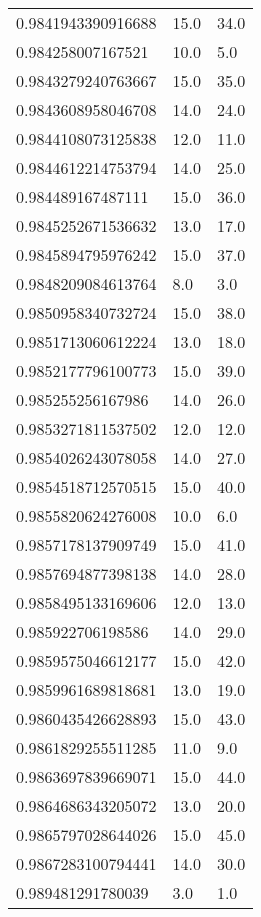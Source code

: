 \begin{center}
\begin{supertabular}[H]{p{0.30\textwidth}p{0.05\textwidth}p{0.05\textwidth}}
0.9841943390916688 & 15.0 & 34.0 \\ 
0.984258007167521 & 10.0 & 5.0 \\ 
0.9843279240763667 & 15.0 & 35.0 \\ 
0.9843608958046708 & 14.0 & 24.0 \\ 
0.9844108073125838 & 12.0 & 11.0 \\ 
0.9844612214753794 & 14.0 & 25.0 \\ 
0.984489167487111 & 15.0 & 36.0 \\ 
0.9845252671536632 & 13.0 & 17.0 \\ 
0.9845894795976242 & 15.0 & 37.0 \\ 
0.9848209084613764 & 8.0 & 3.0 \\ 
0.9850958340732724 & 15.0 & 38.0 \\ 
0.9851713060612224 & 13.0 & 18.0 \\ 
0.9852177796100773 & 15.0 & 39.0 \\ 
0.985255256167986 & 14.0 & 26.0 \\ 
0.9853271811537502 & 12.0 & 12.0 \\ 
0.9854026243078058 & 14.0 & 27.0 \\ 
0.9854518712570515 & 15.0 & 40.0 \\ 
0.9855820624276008 & 10.0 & 6.0 \\ 
0.9857178137909749 & 15.0 & 41.0 \\ 
0.9857694877398138 & 14.0 & 28.0 \\ 
0.9858495133169606 & 12.0 & 13.0 \\ 
0.985922706198586 & 14.0 & 29.0 \\ 
0.9859575046612177 & 15.0 & 42.0 \\ 
0.9859961689818681 & 13.0 & 19.0 \\ 
0.9860435426628893 & 15.0 & 43.0 \\ 
0.9861829255511285 & 11.0 & 9.0 \\ 
0.9863697839669071 & 15.0 & 44.0 \\ 
0.9864686343205072 & 13.0 & 20.0 \\ 
0.9865797028644026 & 15.0 & 45.0 \\ 
0.9867283100794441 & 14.0 & 30.0 \\ 
0.989481291780039 & 3.0 & 1.0 \\ 
\end{supertabular}
\end{center}
